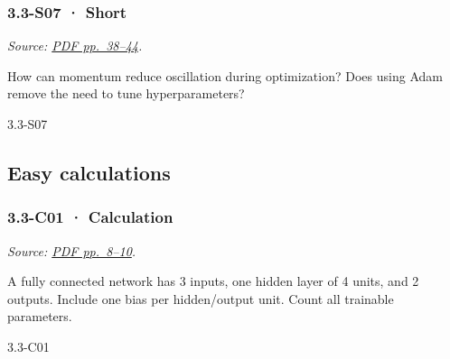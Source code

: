 \noindent\begin{minipage}{\linewidth}

\subsubsection{3.3-S07 · Short}\label{s07-short-9}

\emph{Source:
\href{../Lecture\%20Slides/3.3.\%20Deep\%20Learning\%20Fundamentals.pdf\#page=38}{PDF
pp.~38--44}.}

How can momentum reduce oscillation during optimization? Does using Adam
remove the need to tune hyperparameters?

\begin{solution}[20mm]{3.3-S07}

\end{solution}
\end{minipage}\par\medskip

\subsection{Easy calculations}\label{easy-calculations-9}

\noindent\begin{minipage}{\linewidth}

\subsubsection{3.3-C01 · Calculation}\label{c01-calculation-9}

\emph{Source:
\href{../Lecture\%20Slides/3.3.\%20Deep\%20Learning\%20Fundamentals.pdf\#page=8}{PDF
pp.~8--10}.}

A fully connected network has 3 inputs, one hidden layer of 4 units, and
2 outputs. Include one bias per hidden/output unit. Count all trainable
parameters.

\begin{solution}[26mm]{3.3-C01}

\end{solution}
\end{minipage}\par\medskip

